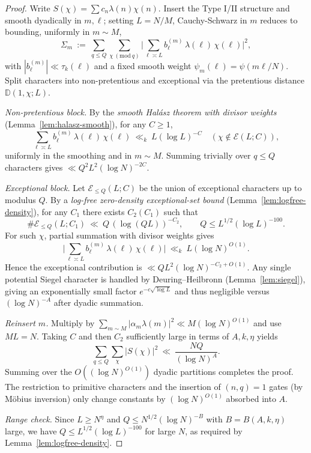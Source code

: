 \documentclass[11pt]{article}
\theoremstyle{definition}
\theoremstyle{remark}
\begin{document}
\begin{proof}
	Write $S(\chi)=\sum c_n\lambda(n)\chi(n)$. Insert the Type I/II structure and smooth dyadically in $m,\ell$; setting $L=N/M$, Cauchy-Schwarz in $m$ reduces to bounding, uniformly in $m\sim M$,
	\[
		\Sigma_m\ :=\ \sum_{q\le Q}\sum_{\chi\ (\mathrm{mod}\ q)}\Big|\sum_{\ell\asymp L} b^{(m)}_\ell\,\lambda(\ell)\,\chi(\ell)\Big|^2,
	\]
	with $|b^{(m)}_\ell|\ll\tau_k(\ell)$ and a fixed smooth weight $\psi_m(\ell)=\psi(m\ell/N)$. Split characters into non-pretentious and exceptional via the pretentious distance $\mathbb D(1,\chi;L)$.

	\emph{Non-pretentious block.} By the \emph{smooth Hal\'asz theorem with divisor weights} (Lemma~\ref{lem:halasz-smooth}), for any $C\ge 1$,
	\[
		\sum_{\ell\asymp L} b^{(m)}_\ell\,\lambda(\ell)\,\chi(\ell)\ \ll_{k}\ L(\log L)^{-C}
		\quad(\chi\notin\mathcal E(L;C)),
	\]
	uniformly in the smoothing and in $m\sim M$. Summing trivially over $q\le Q$ characters gives $\ll Q^2 L^2(\log N)^{-2C}$.

	\emph{Exceptional block.} Let $\mathcal E_{\le Q}(L;C)$ be the union of exceptional characters up to modulus $Q$. By a \emph{log-free zero-density exceptional-set bound} (Lemma~\ref{lem:logfree-density}), for any $C_1$ there exists $C_2(C_1)$ such that
	\[
		\#\mathcal E_{\le Q}(L;C_1)\ \ll\ Q\,(\log (QL))^{-C_2},\qquad Q\le L^{1/2}(\log L)^{-100}.
	\]
	For such $\chi$, partial summation with divisor weights gives
	\[
		\Big|\sum_{\ell\asymp L} b^{(m)}_\ell\,\lambda(\ell)\,\chi(\ell)\Big|\ \ll_{k}\ L(\log N)^{O(1)}.
	\]
	Hence the exceptional contribution is $\ll Q L^2 (\log N)^{-C_2+O(1)}$. Any single potential Siegel character is handled by Deuring–Heilbronn (Lemma~\ref{lem:siegel}), giving an exponentially small factor $e^{-c\sqrt{\log L}}$ and thus negligible versus $(\log N)^{-A}$ after dyadic summation.

	\emph{Reinsert $m$.} Multiply by $\sum_{m\sim M}|\alpha_m\lambda(m)|^2\ll M(\log N)^{O(1)}$ and use $ML=N$. Taking $C$ and then $C_2$ sufficiently large in terms of $A,k,\eta$ yields
	\[
		\sum_{q\le Q}\sum_{\chi}|S(\chi)|^2\ \ll\ \frac{NQ}{(\log N)^A}.
	\]
	Summing over the $O((\log N)^{O(1)})$ dyadic partitions completes the proof. The restriction to primitive characters and the insertion of $(n,q)=1$ gates (by M\"obius inversion) only change constants by $(\log N)^{O(1)}$ absorbed into $A$.

	\emph{Range check.} Since $L\ge N^{\eta}$ and $Q\le N^{1/2}(\log N)^{-B}$ with $B=B(A,k,\eta)$ large, we have $Q\le L^{1/2}(\log L)^{-100}$ for large $N$, as required by Lemma~\ref{lem:logfree-density}.
\end{proof}
\end{document}
